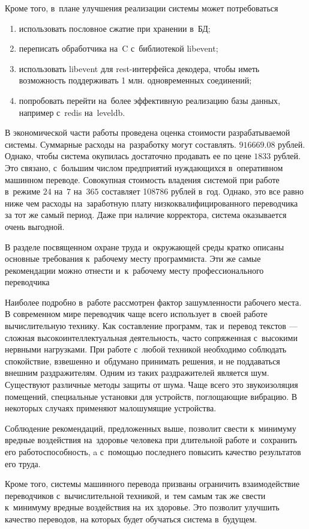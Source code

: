 Кроме того, в~плане улучшения реализации системы может потребоваться
{\renewcommand{\labelenumi}{\alph{enumi})}
	\begin{enumerate}
		\item использовать пословное сжатие при хранении в~БД;
		\item переписать обработчика на~C с~библиотекой libevent;
		\item использовать libevent для rest-интерфейса декодера,
			чтобы иметь возможность поддерживать 1 млн. одновременных соединений;
		\item попробовать перейти на~более эффективную реализацию базы данных, 
			например с~redis на~leveldb.
	\end{enumerate}
}

В экономической части работы проведена оценка стоимости 
разрабатываемой системы.
Суммарные расходы на~разработку могут составлять. $916669.08$ рублей.
Однако, чтобы система окупилась достаточно продавать ее по цене $1833$ рублей.
Это связано, с~большим числом предприятий нуждающихся в~оперативном машинном переводе.
Совокупная стоимость владения системой при работе в~режиме $24$ на~$7$ на~$365$ составляет
108786 рублей в~год. Однако, это все равно ниже чем расходы на~заработную плату
низкоквалифицированного переводчика за тот же самый период.
Даже при наличие корректора, система оказывается очень выгодной.

В разделе посвященном охране труда и~окружающей среды 
кратко описаны основные требования к~рабочему месту
программиста. Эти же самые рекомендации можно отнести 
и~к~рабочему месту профессионального переводчика

Наиболее подробно в~работе рассмотрен фактор зашумленности рабочего места. 
В современном мире переводчик чаще всего использует в~своей работе
вычислительную технику.
Как составление программ, так и~перевод текстов 
--- сложная высокоинтеллектуальная деятельность,
часто сопряженная с~высокими нервными нагрузками. 
При работе с~любой техникой необходимо соблюдать спокойствие, 
взвешенно и~обдумано принимать решения, 
и не поддаваться внешним раздражителям.
Одним из таких раздражителей является шум. 
Существуют различные методы защиты от шума.
Чаще всего это звукоизоляция помещений, 
специальные установки для устройств, поглощающие вибрацию. 
В некоторых случаях применяют малошумящие устройства.

Соблюдение рекомендаций, предложенных выше, позволит свести к~минимуму
вредные воздействия на~здоровье человека 
при длительной работе и~сохранить его работоспособность, 
a с~помощью последнего повысить качество результатов его труда.

Кроме того, системы машинного перевода призваны ограничить взаимодействие 
переводчиков с~вычислительной техникой, и~тем самым так же свести к~минимуму
вредные воздействия на~их здоровье.
Это позволит улучшить качество переводов, 
на которых будет обучаться система в~будущем.

\pagebreak




